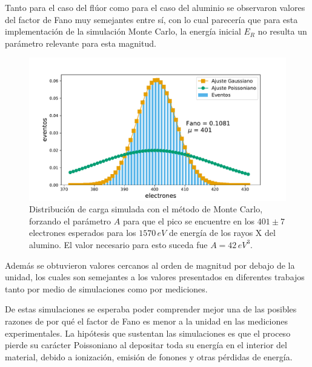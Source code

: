 Tanto para el caso del flúor como para el caso del aluminio se observaron valores del factor de Fano muy semejantes entre sí, con lo cual parecería que para esta implementación de la simulación Monte Carlo, la energía inicial $E_{R}$ no resulta un parámetro relevante para esta magnitud.
\begin{figure}%
    \centering
    \includegraphics[scale=0.5]{Figs/Al_Fano_1570_A42_Eloss0_100ktrials.pdf}
    \caption{\footnotesize{Distribución de carga simulada con el método de Monte Carlo, forzando el parámetro $A$ para que el pico se encuentre en los $401 \pm 7$ electrones esperados para los $1570\,\si{eV}$ de energía de los rayos X del alumino. El valor necesario para esto suceda fue $A=42\,\si{eV}^{3}$.}}
    \label{fig:Al_fano_A42}
\end{figure}
Además se obtuvieron valores cercanos al orden de magnitud por debajo de la unidad, los cuales son semejantes a los valores presentados en diferentes trabajos\cite{Ryan, Alig, Janesick2, Fraser, Owens} tanto por medio de simulaciones como por mediciones.

De estas simulaciones se esperaba poder comprender mejor una de las posibles razones de por qué el factor de Fano es menor a la unidad en las mediciones experimentales. La hipótesis que sustentan las simulaciones es que el proceso pierde su carácter Poissoniano al depositar toda su energía en el interior del material, debido a ionización, emisión de fonones y otras pérdidas de energía.
